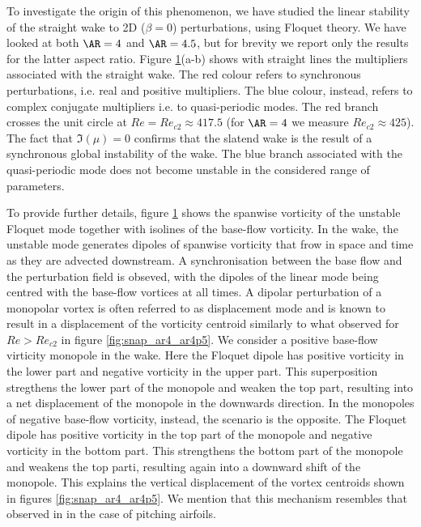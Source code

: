 \begin{figure}
\label{fig:AR4p5_modes_Re430_beta0}
\end{figure}

To investigate the origin of this phenomenon, we have studied the linear stability of the straight wake to 2D ($\beta=0$) perturbations, using Floquet theory. We have looked at both $\AR=4$ and $\AR=4.5$, but for brevity we report only the results for the latter aspect ratio. Figure \ref{fig:AR4p5_modes_Re430_beta0}(a-b) shows with straight lines the multipliers associated with the straight wake. The red colour refers to synchronous perturbations, i.e. real and positive multipliers. The blue colour, instead, refers to complex conjugate multipliers i.e. to quasi-periodic modes. The red branch crosses the unit circle at $Re = Re_{c2} \approx 417.5$ (for $\AR=4$ we measure $Re_{c2} \approx 425$). The fact that $\Im(\mu)=0$ confirms that the slatend wake is the result of a synchronous global instability of the wake. The blue branch associated with the quasi-periodic mode does not become unstable in the considered range of parameters. 

To provide further details, figure \ref{fig:AR4p5_modes_Re430_beta0} shows the spanwise vorticity of the unstable Floquet mode together with isolines of the base-flow vorticity. In the wake, the unstable mode generates dipoles of spanwise vorticity that frow in space and time as they are advected downstream. A synchronisation between the base flow and the perturbation field is obseved, with the dipoles of the linear mode being centred with the base-flow vortices at all times. A dipolar perturbation of a monopolar vortex is often referred to as displacement mode \citep{brion-sipp-jacquin-2014} and is known to result in a displacement of the vorticity centroid similarly to what observed for $Re>Re_{c2}$ in figure \ref{fig:snap_ar4_ar4p5}. We consider a positive base-flow virticity monopole in the wake. Here the Floquet dipole has positive vorticity in the lower part and negative vorticity in the upper part. This superposition stregthens the lower part of the monopole and weaken the top part, resulting into a net displacement  of the monopole in the downwards direction. In the monopoles of negative base-flow vorticity, instead, the scenario is the opposite. The Floquet dipole has positive vorticity in the top part of the monopole and negative vorticity in the bottom part. This strengthens the bottom part of the monopole and weakens the top parti, resulting again into a downward shift of the monopole. This explains the vertical displacement of the vortex centroids shown in figures \ref{fig:snap_ar4_ar4p5}. We mention that this mechanism resembles that observed in \cite{jallas-marquet-fabre-2017} in the case of pitching airfoils.


